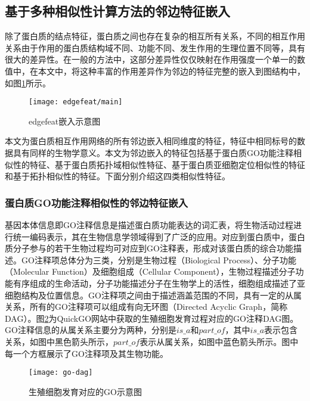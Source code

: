 \subsection{基于多种相似性计算方法的邻边特征嵌入}
\label{subsection:featPPINetwork:edgeFeatConstruct}

除了蛋白质的结点特征，蛋白质之间也存在复杂的相互所有关系，不同的相互作用关系由于作用的蛋白质结构域不同、功能不同、发生作用的生理位置不同等，具有很大的差异性。在一般的方法中，这部分差异性仅仅映射在作用强度一个单一的数值中，在本文中，将这种丰富的作用差异作为邻边的特征完整的嵌入到图结构中，如图\ref{fig:edgefeat/main}所示。


\begin{figure}[htbp]
    \centering
    \texttt{[image: edgefeat/main]}
    \caption{edgefeat嵌入示意图}
    \label{fig:edgefeat/main}
\end{figure}
本文为蛋白质相互作用网络的所有邻边嵌入相同维度的特征，特征中相同标号的数据具有同样的生物学意义。本文为邻边嵌入的特征包括基于蛋白质GO功能注释相似性的特征、基于蛋白质拓扑域相似性特征、基于蛋白质亚细胞定位相似性的特征和基于拓扑相似性的特征。下面分别介绍这四类相似性特征。

\subsubsection{蛋白质GO功能注释相似性的邻边特征嵌入}

基因本体信息\cite{ashburner_gene_2000}即GO注释信息是描述蛋白质功能表达的词汇表，将生物活动过程进行统一编码表示，其在生物信息学领域得到了广泛的应用。对应到蛋白质中，蛋白质分子参与的若干生物过程均可对应到GO注释表，形成对该蛋白质的综合功能描述。GO注释项总体分为三类，分别是生物过程（Biological Process）、分子功能（Molecular Function）及细胞组成（Cellular Component），生物过程描述分子功能有序组成的生命活动，分子功能描述分子在生物学上的活性，细胞组成描述了亚细胞结构及位置信息。GO注释项之间由于描述涵盖范围的不同，具有一定的从属关系，所有的GO注释项可以组成有向无环图（Directed Acyclic Graph，简称DAG）。图\ref{fig:go-dag}为QuickGO\cite{binns_quickgo_2009}网站中获取的生殖细胞发育过程对应的GO注释DAG图。GO注释信息的从属关系主要分为两种，分别是$is\_a$和$part\_of$，其中$is\_a$表示包含关系，如图中黑色箭头所示，$part\_of$表示从属关系，如图中蓝色箭头所示。图中每一个方框展示了GO注释项及其生物功能。
\begin{figure}[htbp]
    \centering
    \texttt{[image: go-dag]}
    \caption{生殖细胞发育对应的GO示意图\cite{binns_quickgo_2009}}
    \label{fig:go-dag}
\end{figure}

